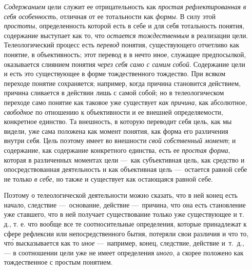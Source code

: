 \documentclass[twoside]{article}
\begin{document}
{{{{{\em Содержанием} цели
служит ее отрицательность как
{\em простая рефлектированная в себя
особенность}, отличная от ее тотальности как
{\em формы}. В силу этой
{\em простоты},
определенность которой есть в себе и для себя тотальность
понятия, содержание выступает как то, что
{\em остается тождественным}
в реализации цели. Телеологический процесс есть
{\em перевод} понятия,
существующего отчетливо как понятие, в объективность; этот перевод в
в нечто иное, служащее предпосылкой, оказывается слиянием понятия
{\em через себя само с самим собой}.
Содержание цели и есть это существующее в форме
тождественного тождество. При всяком переходе понятие сохраняется;
например, когда причина становится действием, причина сливается в действии
лишь с самой собой; но в телеологическом переходе само понятие как таковое
уже существует {\em как причина},
как абсолютное,
{\em свободное} по
отношению к объективности и ее внешней определяемости, конкретное единство.
Та внешность, в которую переводит себя цель, как мы видели, уже сама
положена как момент понятия, как форма его различения внутри себя. Цель
поэтому имеет во внешности {\em свой
собственный момент}; и содержание, как содержание
конкретного единства, есть ее
{\em простая форма},
которая в различенных моментах цели —~как
субъективная цель, как средство и опосредствованная деятельность и как
объективная цель —~остается равной себе не только
{\em в себе}, но также и
существует как остающаяся равной себе.

Поэтому о телеологической деятельности можно сказать, что в
ней конец есть начало, следствие —~основание, действие
—~причина, что она есть становление уже ставшего, что в ней
получает существование только уже существующее и т. д., т. е. что вообще
все те соотносительные определения, которые принадлежат к сфере рефлексии
или непосредственного бытия, потеряли свои различия и что то, что́
высказывается как то
{\em иное} —~например,
конец, следствие, действие и~т.~д., — в соотношении цели уже
не имеет определения 
{\em иного}, а скорее
положено как тождественное с простым понятием.

}}}}
\end{document}
